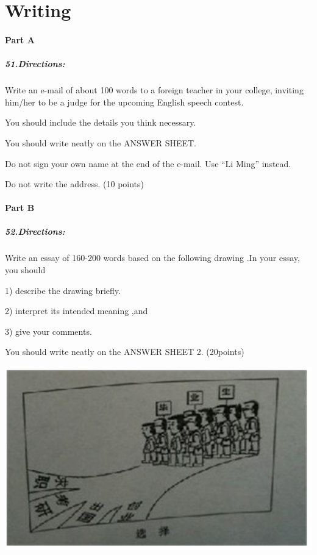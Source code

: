 \section{Writing}
\paragraph{Part A}
\subparagraph{51.Directions:}

Write an e-mail of about 100 words to a foreign teacher in your college, inviting him/her to be a judge for the upcoming English speech contest.

You should include the details you think necessary.

You should write neatly on the ANSWER SHEET.

Do not sign your own name at the end of the e-mail. Use ``Li Ming'' instead.

Do not write the address. (10 points)

\paragraph{Part B}
\subparagraph{52.Directions:}

Write an essay of 160-200 words based on the following drawing .In your essay, you should

1) describe the drawing briefly.

2) interpret its intended meaning ,and

3) give your comments.

You should write neatly on the ANSWER SHEET 2. (20points)

\includegraphics[width=14cm]{8.png}